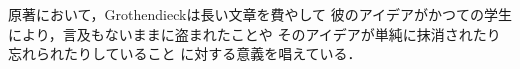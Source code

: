 \documentclass[11pt, a4paper, dvipdfmx]{jlreq}
\theoremstyle{definition}
\theoremstyle{mystyle}
\numberwithin{equation}{section} %
\begin{document}
原著において，Grothendieckは長い文章を費やして
彼のアイデアがかつての学生により，言及もないままに盗まれたことや
そのアイデアが単純に抹消されたり忘れられたりしていること
に対する意義を唱えている．


%
%
\end{document}
